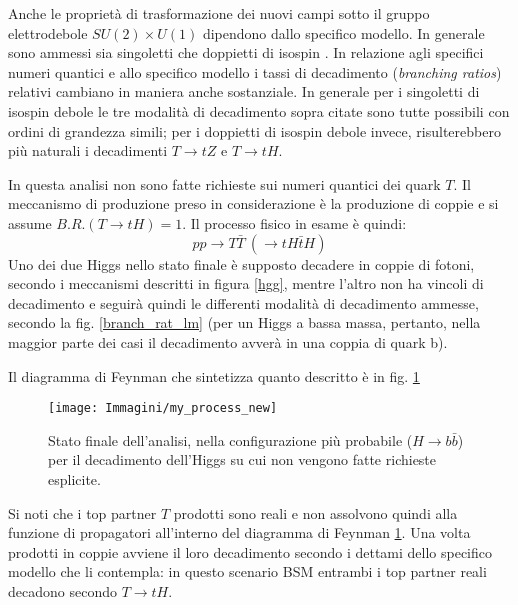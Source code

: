 Anche le proprietà di trasformazione dei nuovi campi sotto il gruppo elettrodebole $SU(2)\times U(1)$ dipendono dallo specifico modello.
\newline
In generale sono ammessi sia singoletti che doppietti di isospin \cite{gent}.
\newline
In relazione agli specifici numeri quantici e allo specifico modello i tassi di decadimento (\textit{branching ratios}) relativi 
cambiano in maniera anche sostanziale.
\newline
In generale per i singoletti di isospin debole le tre modalità di decadimento sopra citate sono tutte possibili
con ordini di grandezza simili; per i doppietti di isospin debole invece, risulterebbero più naturali i decadimenti $T\rightarrow tZ$ e 
$T\rightarrow tH$.



\bigskip
In questa analisi non sono fatte richieste sui numeri quantici dei quark $T$.
Il meccanismo di produzione preso in considerazione è la produzione di coppie 
e si assume $B.R.(T\rightarrow tH)=1$.
\newline
Il processo fisico in esame è quindi:
\begin{equation}
pp\rightarrow T\bar{T} ~(\rightarrow tH\bar{t}H)
\end{equation}
Uno dei due Higgs nello stato finale è supposto decadere in coppie di fotoni, secondo i meccanismi descritti in figura \ref{hgg}, mentre 
l'altro non ha vincoli di decadimento e seguirà quindi le differenti modalità di decadimento ammesse, 
secondo la fig. \ref{branch_rat_lm} (per un Higgs a bassa massa, pertanto, nella maggior parte dei casi il decadimento 
avverà in una coppia di quark b).

\medskip
Il diagramma di Feynman che sintetizza quanto descritto è in fig. \ref{my_proc}

\begin{figure}[!htbp]
\begin{center}
\texttt{[image: Immagini/my\_process\_new]}%
\end{center}
\caption{Stato finale dell'analisi, nella configurazione più probabile ($H\rightarrow b\bar{b}$) per il decadimento dell'Higgs su cui non vengono
fatte richieste esplicite.}
\label{my_proc}
\end{figure}

Si noti che i top partner $T$ prodotti sono reali e non assolvono quindi alla funzione di propagatori all'interno del diagramma di
Feynman \ref{my_proc}.
Una volta prodotti in coppie avviene il loro decadimento secondo i dettami dello specifico modello che li contempla: in questo scenario
\acs{BSM} entrambi i top partner reali decadono secondo $T\rightarrow tH$.


